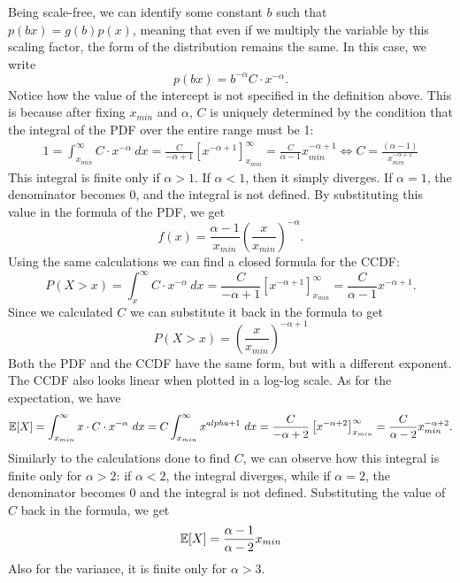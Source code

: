 Being scale-free, we can identify some constant $b$ such that $p(bx) = g(b)p(x)$, meaning that even if we multiply the variable by this scaling factor, the form of the distribution remains the same. In this case, we write
\begin{equation*}
    p(bx) = b^{-\alpha} C \cdot x^{-\alpha}.
\end{equation*}   
Notice how the value of the intercept is not specified in the definition above. This is because after fixing $x_{min}$ and $\alpha$, $C$ is uniquely determined by the condition that the integral of the PDF over the entire range must be 1:
\begin{align*}
    1 = \int_{x_{min}}^{\infty} C \cdot x^{-\alpha} \ dx = \frac{C}{-\alpha + 1}[x^{-\alpha + 1}]_{x_{min}}^{\infty} = \frac{C}{\alpha - 1} x_{min}^{-\alpha + 1} \iff \boxed{C = \frac{(\alpha - 1)}{x_{min}^{-\alpha + 1}}}
\end{align*}
This integral is finite only if $\alpha > 1$. If $\alpha < 1$, then it simply diverges. If $\alpha = 1$, the denominator becomes 0, and the integral is not defined. By substituting this value in the formula of the PDF, we get
\begin{equation*}
    f(x) = \frac{\alpha - 1}{x_{min}} \left ( \frac{x}{x_{min}} \right )^{-\alpha}.
\end{equation*}
Using the same calculations we can find a closed formula for the CCDF:
\begin{equation*}
    P(X > x) = \int_{x}^{\infty} C \cdot x^{-\alpha} \ dx = \frac{C}{-\alpha + 1}[x^{-\alpha + 1}]_{x_{min}}^{\infty} = \frac{C}{\alpha - 1} x^{-\alpha + 1}.
\end{equation*}
Since we calculated $C$ we can substitute it back in the formula to get
\begin{equation*}
    P(X > x) = \left ( \frac{x}{x_{min}} \right )^{-\alpha + 1}
\end{equation*}
Both the PDF and the CCDF have the same form, but with a different exponent. The CCDF also looks linear when plotted in a log-log scale.
As for the expectation, we have
\begin{equation*}
    \mathbb{E}[X] = \int_{x_{min}}^{\infty} x \cdot C \cdot x^{-\alpha} \ dx = C \int_{x_{min}}^{\infty} x^{\-alpha + 1} \ dx = \frac{C}{-\alpha + 2} \left [ x^{-\alpha + 2} \right ]_{x_{min}}^{\infty} = \frac{C}{\alpha - 2} x_{min}^{-\alpha + 2}.
\end{equation*}
Similarly to the calculations done to find $C$, we can observe how this integral is finite only for $\alpha > 2$: if $\alpha < 2$, the integral diverges, while if $\alpha = 2$, the denominator becomes 0 and the integral is not defined. Substituting the value of $C$ back in the formula, we get
\begin{equation*}
    \mathbb{E}[X] = \frac{\alpha - 1}{\alpha - 2} x_{min}
\end{equation*}
Also for the variance, it is finite only for $\alpha > 3$.

